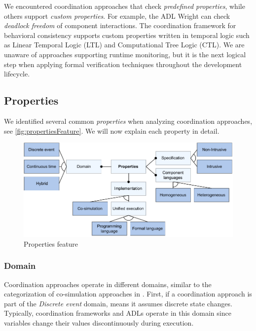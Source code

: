 \documentclass[runningheads]{llncs}
\begin{document}
We encountered coordination approaches that check \textit{predefined properties}, while others support \textit{custom properties}.
For example, the ADL Wright \cite{allenFormalBasisArchitectural1997} can check \textit{deadlock freedom} of component interactions.
The coordination framework for behavioral consistency \cite{krauterBehavioralConsistencyMultimodeling2023} supports custom properties written in temporal logic such as Linear Temporal Logic (LTL) and Computational Tree Logic (CTL).
We are unaware of approaches supporting runtime monitoring, but it is the next logical step when applying formal verification techniques throughout the development lifecycle.

\subsection{Properties}
We identified several common \textit{properties} when analyzing coordination approaches, see \autoref{fig:propertiesFeature}.
We will now explain each property in detail.

\begin{figure}[ht]
	\centering
	\includegraphics[width=1\textwidth]{images/properties_feature}
	\caption{Properties feature}
	\label{fig:propertiesFeature}
\end{figure}

\subsubsection{Domain} Coordination approaches operate in different domains, similar to the categorization of co-simulation approaches in \cite{gomesCoSimulationSurvey2019}.
First, if a coordination approach is part of the \textit{Discrete event} domain, means it assumes discrete state changes.
Typically, coordination frameworks and ADLs operate in this domain since variables change their values discontinuously during execution.
\end{document}
